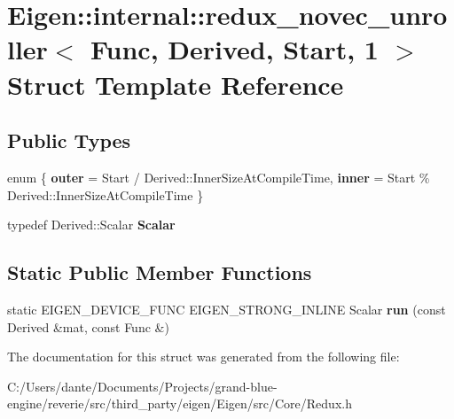 \hypertarget{struct_eigen_1_1internal_1_1redux__novec__unroller_3_01_func_00_01_derived_00_01_start_00_011_01_4}{}\section{Eigen\+::internal\+::redux\+\_\+novec\+\_\+unroller$<$ Func, Derived, Start, 1 $>$ Struct Template Reference}
\label{struct_eigen_1_1internal_1_1redux__novec__unroller_3_01_func_00_01_derived_00_01_start_00_011_01_4}
\subsection*{Public Types}
\begin{DoxyCompactItemize}
\item 
\mbox{\label{struct_eigen_1_1internal_1_1redux__novec__unroller_3_01_func_00_01_derived_00_01_start_00_011_01_4_a1195f8ac2b579ab520e40aebca18fa6a}} 
enum \{ {\bfseries outer} = Start / Derived\+::Inner\+Size\+At\+Compile\+Time, 
{\bfseries inner} = Start \% Derived\+::Inner\+Size\+At\+Compile\+Time
 \}
\item 
\mbox{\label{struct_eigen_1_1internal_1_1redux__novec__unroller_3_01_func_00_01_derived_00_01_start_00_011_01_4_a0ef89651eff09a03c2d3efbcaee49593}} 
typedef Derived\+::\+Scalar {\bfseries Scalar}
\end{DoxyCompactItemize}
\subsection*{Static Public Member Functions}
\begin{DoxyCompactItemize}
\item 
\mbox{\label{struct_eigen_1_1internal_1_1redux__novec__unroller_3_01_func_00_01_derived_00_01_start_00_011_01_4_a02b496586cb50a903ccdc3a7eb31518c}} 
static E\+I\+G\+E\+N\+\_\+\+D\+E\+V\+I\+C\+E\+\_\+\+F\+U\+NC E\+I\+G\+E\+N\+\_\+\+S\+T\+R\+O\+N\+G\+\_\+\+I\+N\+L\+I\+NE Scalar {\bfseries run} (const Derived \&mat, const Func \&)
\end{DoxyCompactItemize}


The documentation for this struct was generated from the following file\+:\begin{DoxyCompactItemize}
\item 
C\+:/\+Users/dante/\+Documents/\+Projects/grand-\/blue-\/engine/reverie/src/third\+\_\+party/eigen/\+Eigen/src/\+Core/Redux.\+h\end{DoxyCompactItemize}
